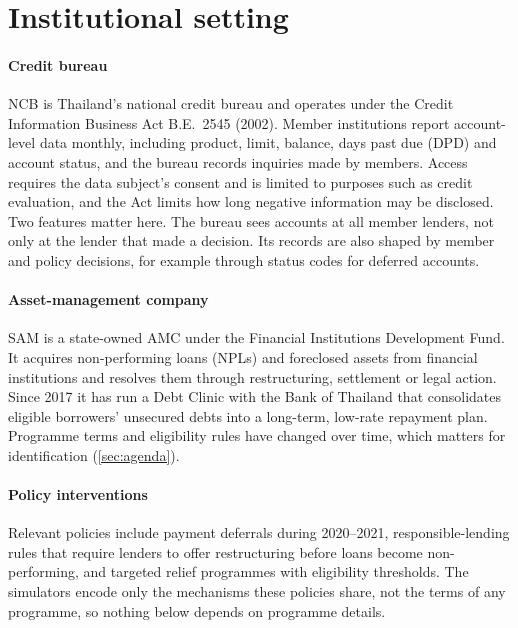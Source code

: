 \documentclass[10pt]{article}
\begin{document}
\section{Institutional setting}\label{sec:setting}

\paragraph{Credit bureau} NCB is Thailand's national credit bureau and operates under the Credit Information Business Act B.E.~2545 (2002). Member institutions report account-level data monthly, including product, limit, balance, days past due (DPD) and account status, and the bureau records inquiries made by members. Access requires the data subject's consent and is limited to purposes such as credit evaluation, and the Act limits how long negative information may be disclosed. Two features matter here. The bureau sees accounts at all member lenders, not only at the lender that made a decision. Its records are also shaped by member and policy decisions, for example through status codes for deferred accounts.

\paragraph{Asset-management company} SAM is a state-owned AMC under the Financial Institutions Development Fund. It acquires non-performing loans (NPLs) and foreclosed assets from financial institutions and resolves them through restructuring, settlement or legal action. Since 2017 it has run a Debt Clinic with the Bank of Thailand that consolidates eligible borrowers' unsecured debts into a long-term, low-rate repayment plan. Programme terms and eligibility rules have changed over time, which matters for identification (\cref{sec:agenda}).

\paragraph{Policy interventions} Relevant policies include payment deferrals during 2020--2021, responsible-lending rules that require lenders to offer restructuring before loans become non-performing, and targeted relief programmes with eligibility thresholds. The simulators encode only the mechanisms these policies share, not the terms of any programme, so nothing below depends on programme details.

\end{document}

